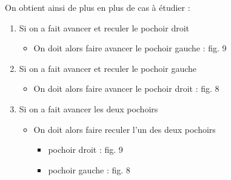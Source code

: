 On obtient ainsi de plus en plus de cas à étudier :\\
\begin{enumerate}
  \item Si on a fait avancer et reculer le pochoir droit
    \begin{itemize}
      \item On doit alors faire avancer le pochoir gauche : fig. 9
    \end{itemize}
  \item Si on a fait avancer et reculer le pochoir gauche
    \begin{itemize}
      \item On doit alors faire avancer le pochoir droit : fig. 8
    \end{itemize}
  \item Si on a fait avancer les deux pochoirs
    \begin{itemize}
      \item On doit alors faire reculer l'un des deux pochoirs
        \begin{itemize}
          \item pochoir droit : fig. 9
          \item pochoir gauche : fig. 8
        \end{itemize}
   \end{itemize}
\end{enumerate}



